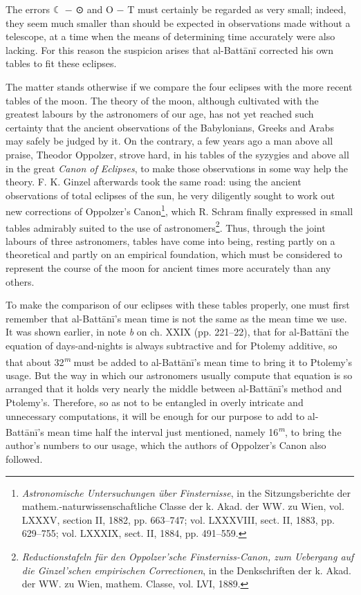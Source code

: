 \documentclass[11pt]{article}
\newcommand{\Pg}[1]{\marginpar{\footnotesize\color{gray}#1}}
\begin{document}
\par The errors {\MoonFont\upshape ☾} − {\MoonFont\upshape ⊙} and O − T must certainly be regarded as very small; indeed, they seem much smaller than should be expected in observations made without a telescope, at a time when the means of determining time accurately were also lacking. For this reason the suspicion arises that al-Battānī corrected his own tables to fit these eclipses.\par
\par \Pg{I 233}The matter stands otherwise if we compare the four eclipses with the more recent tables of the moon. The theory of the moon, although cultivated with the greatest labours by the astronomers of our age, has not yet reached such certainty that the ancient observations of the Babylonians, Greeks and Arabs may safely be judged by it. On the contrary, a few years ago a man above all praise, Theodor Oppolzer, strove hard, in his tables of the syzygies and above all in the great \emph{Canon of Eclipses}, to make those observations in some way help the theory. F. K. Ginzel afterwards took the same road: using the ancient observations of total eclipses of the sun, he very diligently sought to work out new corrections of Oppolzer's Canon\footnote{\emph{Astronomische Untersuchungen über Finsternisse}, in the Sitzungsberichte der mathem.-naturwissenschaftliche Classe der k. Akad. der WW. zu Wien, vol. LXXXV, section II, 1882, pp. 663–747; vol. LXXXVIII, sect. II, 1883, pp. 629–755; vol. LXXXIX, sect. II, 1884, pp. 491–559.}, which R. Schram finally expressed in small tables admirably suited to the use of astronomers\footnote{\emph{Reductionstafeln für den Oppolzer’sche Finsterniss-Canon, zum Uebergang auf die Ginzel’schen empirischen Correctionen}, in the Denkschriften der k. Akad. der WW. zu Wien, mathem. Classe, vol. LVI, 1889.}. Thus, through the joint labours of three astronomers, tables have come into being, resting partly on a theoretical and partly on an empirical foundation, which must be considered to represent the course of the moon for ancient times more accurately than any others.\par
\par To make the comparison of our eclipses with these tables properly, one must first remember that al-Battānī's mean time is not the same as the mean time we use. It was shown earlier, in note \emph{b} on ch. XXIX (pp. 221–22), that for al-Battānī the equation of days-and-nights is always subtractive and for Ptolemy additive, so that about 32\textsuperscript{\itshape m} must be added to al-Battānī's mean time to bring it to Ptolemy's usage. But the way in which our astronomers usually compute that equation is so arranged that it holds very nearly the middle between al-Battānī's method and Ptolemy's. Therefore, so as not to be entangled in overly intricate and unnecessary computations, it will be enough for our purpose to add to al-Battānī's mean time half the interval just mentioned, namely 16\textsuperscript{\itshape m}, to bring the author's numbers to our usage, which the authors of Oppolzer's Canon also followed.\par
\end{document}
